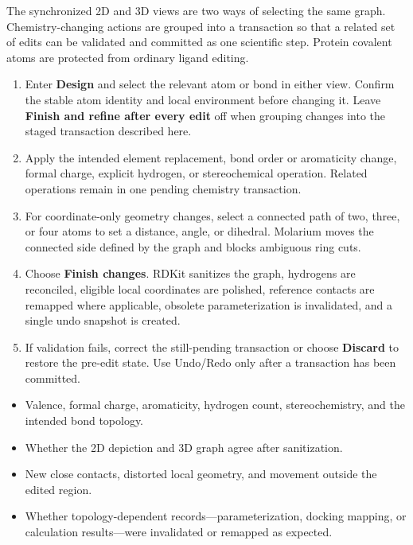 \documentclass[11pt]{article}
\begin{document}

The synchronized 2D and 3D views are two ways of selecting the same graph. Chemistry-changing actions are grouped into a transaction so that a related set of edits can be validated and committed as one scientific step. Protein covalent atoms are protected from ordinary ligand editing.


\begin{enumerate}
\item Enter \textbf{Design} and select the relevant atom or bond in either view. Confirm the stable atom identity and local environment before changing it. Leave \textbf{Finish and refine after every edit} off when grouping changes into the staged transaction described here.
\item Apply the intended element replacement, bond order or aromaticity change, formal charge, explicit hydrogen, or stereochemical operation. Related operations remain in one pending chemistry transaction.
\item For coordinate-only geometry changes, select a connected path of two, three, or four atoms to set a distance, angle, or dihedral. Molarium moves the connected side defined by the graph and blocks ambiguous ring cuts.
\item Choose \textbf{Finish changes}. RDKit sanitizes the graph, hydrogens are reconciled, eligible local coordinates are polished, reference contacts are remapped where applicable, obsolete parameterization is invalidated, and a single undo snapshot is created.
\item If validation fails, correct the still-pending transaction or choose \textbf{Discard} to restore the pre-edit state. Use Undo/Redo only after a transaction has been committed.
\end{enumerate}


\begin{itemize}
\item Valence, formal charge, aromaticity, hydrogen count, stereochemistry, and the intended bond topology.
\item Whether the 2D depiction and 3D graph agree after sanitization.
\item New close contacts, distorted local geometry, and movement outside the edited region.
\item Whether topology-dependent records---parameterization, docking mapping, or calculation results---were invalidated or remapped as expected.
\end{itemize}
\end{document}
